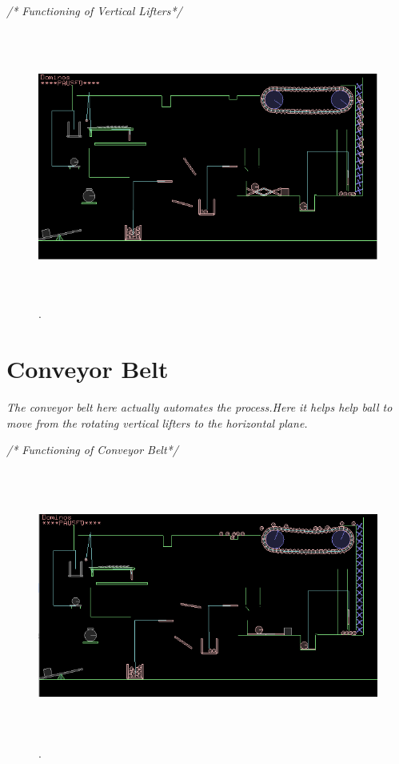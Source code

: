 \documentclass[a4paper]{article}
\begin{document}
\begin{flushleft}
\begin{itemize}
			\begin{center}
						\textit{/* Functioning of Vertical Lifters*/}
					\end{center}
				\vspace{-25pt}
				\begin{figure}[H]
				\centering
				\vspace{20pt}
				\includegraphics[width=180mm,height=90mm]{5}.
				\end{figure}
				
		\section{Conveyor Belt}
			\vspace{-10pt}
		\large\textit{The conveyor belt here actually automates the process.Here it helps help ball to move from the rotating vertical lifters to the horizontal plane.}
			\begin{center}
						\textit{/* Functioning of Conveyor Belt*/}
					\end{center}
				\vspace{-25pt}
				\begin{figure}[H]
				\centering
				\vspace{20pt}
				\includegraphics[width=180mm,height=90mm]{6}.
				\end{figure}
				

\end{itemize}
\end{flushleft}
\end{document}

